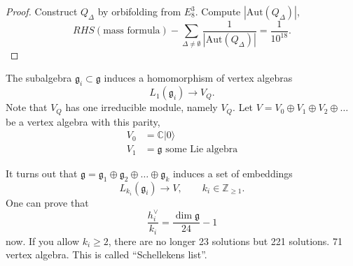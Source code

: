 \begin{proof}
Construct $Q_\Delta$ by orbifolding from $E_8^3$.
Compute $|\text{Aut}(Q_\Delta)|$,
 $$
RHS(\text{mass formula})-\sum_{\Delta \neq \emptyset}
\frac{1}{|\text{Aut}(Q_\Delta)|}=\frac{1}{10^{18}}.
$$
\end{proof}

\medskip\noindent
The subalgebra $\mathfrak{g}_i\subset \mathfrak{g}$
induces a homomorphism of vertex algebras
$$
L_1(\mathfrak{g}_i) \to V_Q.
$$
Note that $V_Q$ has one irreducible module,
namely $V_Q$.
Let $V=V_0 \oplus V_1 \oplus V_2 \oplus \ldots$
be a vertex algebra with this parity,
\begin{align*}
V_0&=\mathbb{C}|0\rangle\\
V_1&=\mathfrak{g}\text{ some Lie algebra}
\end{align*}

\noindent
It turns out that $\mathfrak{g}=\mathfrak{g}_1 \oplus \mathfrak{g}_2
\oplus \ldots \oplus \mathfrak{g}_k$ 
induces a set of embeddings 
$$
L_{k_i}(\mathfrak{g}_i) \to V,\qquad  k_i \in \mathbb{Z}_{\geq 1}.
$$
One can prove that
$$
\frac{h_i^\vee}{k_i}
=\frac{\dim\mathfrak{g}}{24}-1
$$
now. If you allow $k_i\geq 2$,
there are no longer 23 solutions
but 221 solutions.
71 vertex algebra. This is called
``Schellekens list''.







